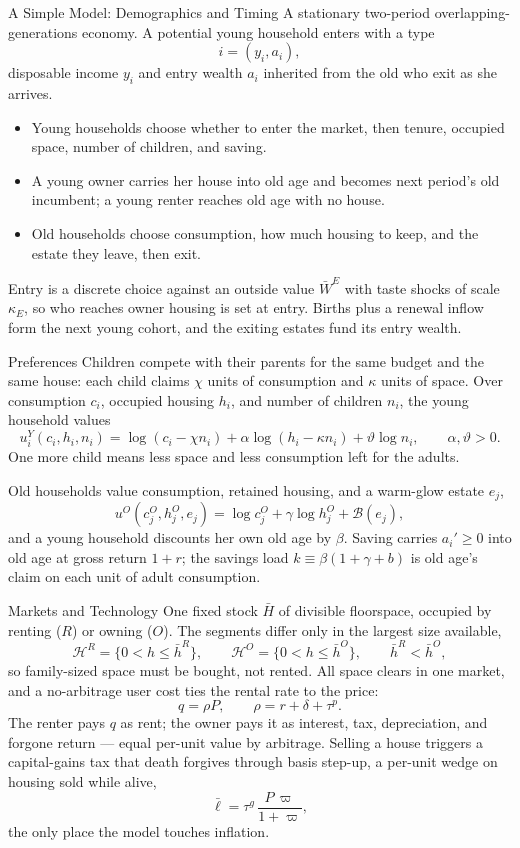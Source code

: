\documentclass[aspectratio=169,10pt]{beamer}
\providecommand{\1}{\mathbf 1}
\providecommand{\HH}{\mathcal H}
\begin{document}
\begin{frame}{A Simple Model: Demographics and Timing}
  A stationary two-period overlapping-generations economy. A potential young household enters with a type
  \[
  i=(y_i,a_i),
  \]
  disposable income $y_i$ and entry wealth $a_i$ inherited from the old who exit as she arrives.
  \begin{itemize}
    \item Young households choose whether to enter the market, then tenure, occupied space, number of children, and saving.
    \item A young owner carries her house into old age and becomes next period's old incumbent; a young renter reaches old age with no house.
    \item Old households choose consumption, how much housing to keep, and the estate they leave, then exit.
  \end{itemize}
  Entry is a discrete choice against an outside value $\bar W^E$ with taste shocks of scale $\kappa_E$, so who reaches owner housing is set at entry. Births plus a renewal inflow form the next young cohort, and the exiting estates fund its entry wealth.
\end{frame}

\begin{frame}{Preferences}
  Children compete with their parents for the same budget and the same house: each child claims $\chi$ units of consumption and $\kappa$ units of space. Over consumption $c_i$, occupied housing $h_i$, and number of children $n_i$, the young household values
  \[
  u_i^Y(c_i,h_i,n_i)=\log(c_i-\chi n_i)+\alpha\log(h_i-\kappa n_i)+\vartheta\log n_i,
  \qquad \alpha,\vartheta>0.
  \]
  One more child means less space and less consumption left for the adults.

  Old households value consumption, retained housing, and a warm-glow estate $e_j$,
  \[
  u^O(c_j^O,h_j^O,e_j)=\log c_j^O+\gamma\log h_j^O+\mathcal B(e_j),
  \]
  and a young household discounts her own old age by $\beta$. Saving carries $a_i'\ge0$ into old age at gross return $1+r$; the savings load $k\equiv\beta(1+\gamma+b)$ is old age's claim on each unit of adult consumption.
\end{frame}

\begin{frame}{Markets and Technology}
  One fixed stock $\bar H$ of divisible floorspace, occupied by renting ($R$) or owning ($O$). The segments differ only in the largest size available,
  \[
  \HH^R=\{0<h\le\bar h^R\},\qquad \HH^O=\{0<h\le\bar h^O\},\qquad \bar h^R<\bar h^O,
  \]
  so family-sized space must be bought, not rented. All space clears in one market, and a no-arbitrage user cost ties the rental rate to the price:
  \[
  q=\rho P,\qquad \rho=r+\delta+\tau^p.
  \]
  The renter pays $q$ as rent; the owner pays it as interest, tax, depreciation, and forgone return --- equal per-unit value by arbitrage. Selling a house triggers a capital-gains tax that death forgives through basis step-up, a per-unit wedge on housing sold while alive,
  \[
  \bar\ell=\tau^g\,\frac{P\,\varpi}{1+\varpi},
  \]
  the only place the model touches inflation.
\end{frame}
\end{document}
